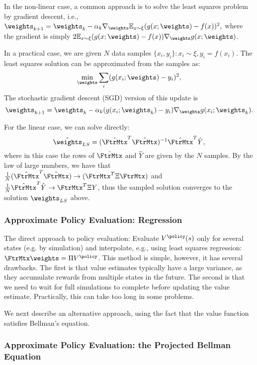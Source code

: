In the non-linear case, a common approach is to solve the least squares problem by gradient descent, i.e., $\weights_{k+1} = \weights_k - \alpha_k \nabla_\weights \mathbb{E}_{x\sim\xi} (g(x;\weights) - f(x))^2,$ where the gradient is simply $2 \mathbb{E}_{x\sim\xi} (g(x;\weights) - f(x))\nabla_\weights g(x;\weights)$. 

In a practical case, we are given $N$ data samples $\{ x_i, y_i \}: x_i\sim \xi, y_i=f(x_i)$. The least squares solution can be approximated from the samples as:
$$
\min_\weights \sum_i (g(x_i;\weights) - y_i)^2,
$$
The stochastic gradient descent (SGD) version of this update is
$$
\weights_{k+1} = \weights_k - \alpha_k (g(x_i;\weights_k) - y_i)\nabla_\weights g(x_i;\weights_k).
$$

For the linear case, we can solve directly:
$$
\hat{\weights}_{LS} = (\hat{\FtrMtx}^T \hat{\FtrMtx})^{-1} \hat{\FtrMtx}^T \hat{Y},
$$
where in this case the rows of $\hat{\FtrMtx}$ and $\hat{Y}$ are given by the $N$ samples. By the law of large numbers, we have that $\frac{1}{N}(\hat{\FtrMtx}^T \hat{\FtrMtx}) \to (\FtrMtx^T \Xi \FtrMtx)$ and $\frac{1}{N}\hat{\FtrMtx}^T \hat{Y} \to \FtrMtx^T \Xi Y$, thus the sampled solution converges to the solution $\weights_{LS}$ above.

\subsubsection{Approximate Policy Evaluation: Regression}

The direct approach to policy evaluation: Evaluate $V^\policy(s)$ only for several states (e.g. by simulation) and interpolate, e.g., using least squares regression: $\FtrMtx \weights = \Pi V^\policy$. This method is simple, however, it has several drawbacks. The first is that value estimates typically have a large variance, as they accumulate rewards from multiple states in the future. The second is that we need to wait for full simulations to complete before updating the value estimate. Practically, this can take too long in some problems. 

We next describe an alternative approach, using the fact that the value function satisfies Bellman's equation.

\subsubsection{Approximate Policy Evaluation: the Projected Bellman Equation}

